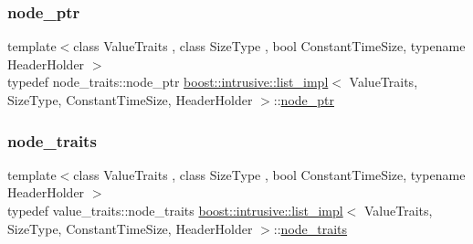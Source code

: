 \mbox{\label{classboost_1_1intrusive_1_1list__impl_a1b1b1d87a4edc6bfee4e43622184e689}} 
\subsubsection{\texorpdfstring{node\+\_\+ptr}{node\_ptr}}
{\footnotesize\ttfamily template$<$class Value\+Traits , class Size\+Type , bool Constant\+Time\+Size, typename Header\+Holder $>$ \\
typedef node\+\_\+traits\+::node\+\_\+ptr \hyperlink{classboost_1_1intrusive_1_1list__impl}{boost\+::intrusive\+::list\+\_\+impl}$<$ Value\+Traits, Size\+Type, Constant\+Time\+Size, Header\+Holder $>$\+::\hyperlink{classboost_1_1intrusive_1_1list__impl_a1b1b1d87a4edc6bfee4e43622184e689}{node\+\_\+ptr}}

\mbox{\label{classboost_1_1intrusive_1_1list__impl_ae96503e0398292d5763e84a6baf677ba}} 
\subsubsection{\texorpdfstring{node\+\_\+traits}{node\_traits}}
{\footnotesize\ttfamily template$<$class Value\+Traits , class Size\+Type , bool Constant\+Time\+Size, typename Header\+Holder $>$ \\
typedef value\+\_\+traits\+::node\+\_\+traits \hyperlink{classboost_1_1intrusive_1_1list__impl}{boost\+::intrusive\+::list\+\_\+impl}$<$ Value\+Traits, Size\+Type, Constant\+Time\+Size, Header\+Holder $>$\+::\hyperlink{classboost_1_1intrusive_1_1list__impl_ae96503e0398292d5763e84a6baf677ba}{node\+\_\+traits}}

\mbox{\label{classboost_1_1intrusive_1_1list__impl_a671027d235426ed75ab9e4b2e090afe5}} 
